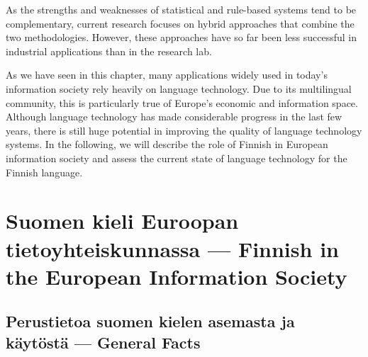 \documentclass[]{../../metanetpaper}
\begin{document}
\begin{Parallel}[c]{70mm}{70mm}
{As the strengths and weaknesses of statistical and rule-based systems tend to
be complementary, current research focuses on hybrid approaches that combine
the two methodologies. However, these approaches have so far been less
successful in industrial applications than in the research lab.

As we have seen in this chapter, many applications widely used in today’s
information society rely heavily on language technology. Due to its
multilingual community, this is particularly true of Europe’s economic and
information space. Although language technology has made considerable progress
in the last few years, there is still huge potential in improving the quality
of language technology systems. In the following, we will describe the role of
Finnish in European information society and assess the current state of
language technology for the Finnish language.
}

\ParallelPar

\section{Suomen kieli Euroopan tietoyhteiskunnassa --- Finnish in the European Information Society}



\ParallelPar

\subsection{Perustietoa suomen kielen asemasta ja käytöstä --- General Facts}

\end{Parallel}
\end{document}
